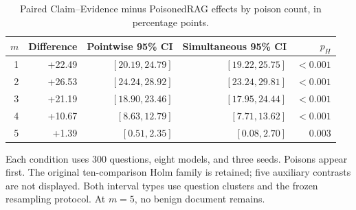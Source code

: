 \begin{table}[!htbp]
\centering
\caption{Paired Claim--Evidence minus PoisonedRAG effects by poison count, in percentage points.}
\label{tab:apx_count_ci}
\begingroup\fontsize{9}{10.8}\selectfont
\setlength{\tabcolsep}{4.0pt}
\renewcommand{\arraystretch}{1.13}
\begin{tabular}{@{}rrrrr@{}}
\toprule
$m$ & Difference & Pointwise 95\% CI & Simultaneous 95\% CI & $p_H$ \\
\midrule
1 & +22.49 & $[20.19, 24.79]$ & $[19.22, 25.75]$ & $<0.001$ \\
2 & +26.53 & $[24.24, 28.92]$ & $[23.24, 29.81]$ & $<0.001$ \\
3 & +21.19 & $[18.90, 23.46]$ & $[17.95, 24.44]$ & $<0.001$ \\
4 & +10.67 & $[8.63, 12.79]$ & $[7.71, 13.62]$ & $<0.001$ \\
5 & +1.39 & $[0.51, 2.35]$ & $[0.08, 2.70]$ & 0.003 \\
\bottomrule
\end{tabular}
\endgroup
\par\vspace{4pt}\begin{minipage}{\linewidth}\footnotesize Each condition uses 300 questions, eight models, and three seeds. Poisons appear first. The original ten-comparison Holm family is retained; five auxiliary contrasts are not displayed. Both interval types use question clusters and the frozen resampling protocol. At $m=5$, no benign document remains.\end{minipage}
\end{table}

